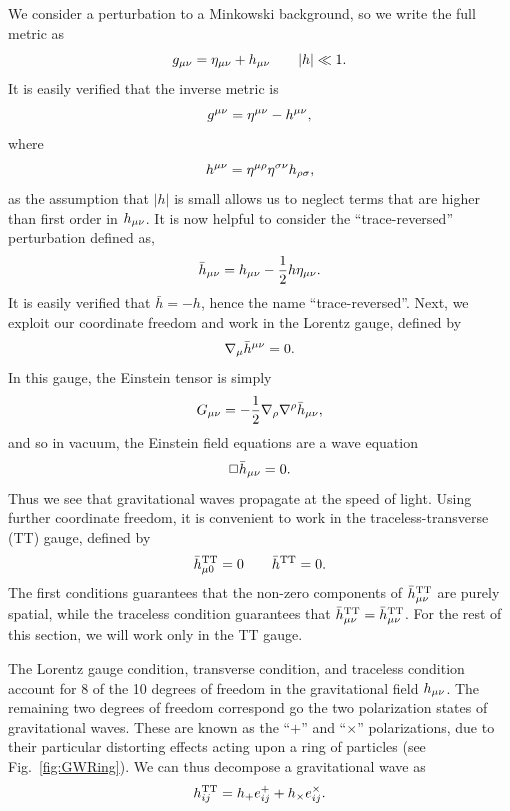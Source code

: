 We consider a perturbation to a Minkowski background, so we write the full metric as
\begin{equation}
g_{\mu\nu}=\eta_{\mu\nu} + h_{\mu\nu}\qquad|h|\ll 1.
\end{equation}
It is easily verified that the inverse metric is
\begin{equation}
g^{\mu\nu}=\eta^{\mu\nu}-h^{\mu\nu},
\end{equation}
where 
\begin{equation}
h^{\mu\nu}=\eta^{\mu\rho}\eta^{\sigma\nu}h_{\rho\sigma},
\end{equation}
as the assumption that $|h|$ is small allows us to neglect terms that are higher than first order in $h_{\mu\nu}$. It is now helpful to consider the ``trace-reversed'' perturbation defined as,
\begin{equation}
\bar{h}_{\mu\nu}=h_{\mu\nu}-\frac{1}{2}h\eta_{\mu\nu}.
\end{equation}
It is easily verified that $\bar{h}=-h$, hence the name ``trace-reversed''. Next, we exploit our coordinate freedom and work in the Lorentz gauge, defined by
\begin{equation}
\nabla_{\mu}\bar{h}^{\mu\nu}=0.
\end{equation}
In this gauge, the Einstein tensor is simply
\begin{equation}
G_{\mu\nu}=-\frac{1}{2}\nabla_{\rho}\nabla^{\rho}\bar{h}_{\mu\nu},
\end{equation}
and so in vacuum, the Einstein field equations are a wave equation
\begin{equation}
\Box\bar{h}_{\mu\nu}=0.
\end{equation}
Thus we see that gravitational waves propagate at the speed of light. Using further coordinate freedom, it is convenient to work in the traceless-transverse (TT) gauge, defined by
\begin{equation}
\bar{h}_{\mu0}^{\rm{TT}}=0\qquad \bar{h}^{\rm{TT}}=0.
\end{equation}
The first conditions guarantees that the non-zero components of $\bar{h}_{\mu\nu}^{\rm{TT}}$ are purely spatial, while the traceless condition guarantees that $\bar{h}_{\mu\nu}^{\rm{TT}}=\bar{h}_{\mu\nu}^{\rm{TT}}$. For the rest of this section, we will work only in the TT gauge.

The Lorentz gauge condition, transverse condition, and traceless condition account for 8 of the 10 degrees of freedom in the gravitational field $h_{\mu\nu}$. The remaining two degrees of freedom correspond go the two polarization states of gravitational waves. These are known as the ``$+$'' and ``$\times$'' polarizations, due to their particular distorting effects acting upon a ring of particles (see Fig.~\ref{fig:GWRing}). We can thus decompose a gravitational wave as
\begin{equation}
h_{ij}^{\rm{TT}}=h_{+}e^{+}_{ij}+h_{\times}e_{ij}^{\times}.
\end{equation}

